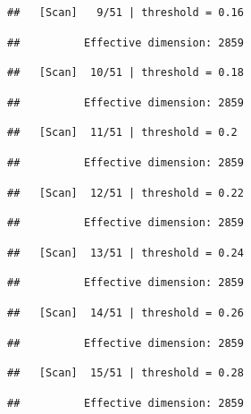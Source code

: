 \documentclass[
]{book}
\begin{document}
\begin{verbatim}
##   [Scan]   9/51 | threshold = 0.16
\end{verbatim}

\begin{verbatim}
##          Effective dimension: 2859
\end{verbatim}

\begin{verbatim}
##   [Scan]  10/51 | threshold = 0.18
\end{verbatim}

\begin{verbatim}
##          Effective dimension: 2859
\end{verbatim}

\begin{verbatim}
##   [Scan]  11/51 | threshold = 0.2
\end{verbatim}

\begin{verbatim}
##          Effective dimension: 2859
\end{verbatim}

\begin{verbatim}
##   [Scan]  12/51 | threshold = 0.22
\end{verbatim}

\begin{verbatim}
##          Effective dimension: 2859
\end{verbatim}

\begin{verbatim}
##   [Scan]  13/51 | threshold = 0.24
\end{verbatim}

\begin{verbatim}
##          Effective dimension: 2859
\end{verbatim}

\begin{verbatim}
##   [Scan]  14/51 | threshold = 0.26
\end{verbatim}

\begin{verbatim}
##          Effective dimension: 2859
\end{verbatim}

\begin{verbatim}
##   [Scan]  15/51 | threshold = 0.28
\end{verbatim}

\begin{verbatim}
##          Effective dimension: 2859
\end{verbatim}
\end{document}
